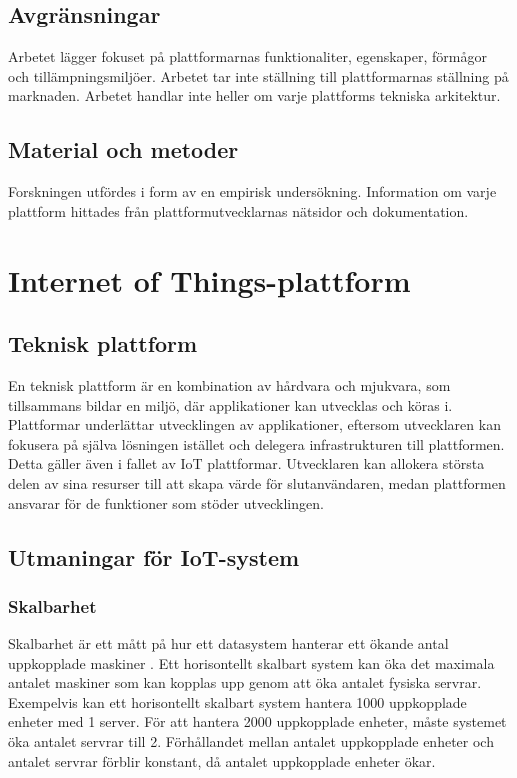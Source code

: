 \subsection{Avgränsningar}
Arbetet lägger fokuset på plattformarnas funktionaliter, egenskaper, förmågor
och tillämpningsmiljöer.
Arbetet tar inte ställning till plattformarnas ställning på marknaden.
Arbetet handlar inte heller om varje plattforms tekniska arkitektur.

\subsection{Material och metoder}
Forskningen utfördes i form av en empirisk undersökning. Information om varje
plattform hittades från plattformutvecklarnas nätsidor och dokumentation.

\pagebreak




\section{Internet of Things-plattform}
\label{sec:esimluku}


\subsection{Teknisk plattform}

En teknisk plattform är en kombination av hårdvara och mjukvara, som
tillsammans bildar en miljö, där applikationer kan utvecklas och köras i.
Plattformar underlättar utvecklingen av applikationer, eftersom utvecklaren
kan fokusera på själva lösningen istället och delegera infrastrukturen
till plattformen.
Detta gäller även i fallet av IoT plattformar. Utvecklaren kan allokera
största delen av sina resurser till att skapa värde för slutanvändaren,
medan plattformen ansvarar för de funktioner som stöder utvecklingen.

\subsection{Utmaningar för IoT-system}

\subsubsection{Skalbarhet}
Skalbarhet är ett mått på hur ett datasystem hanterar ett ökande antal 
uppkopplade maskiner \cite{scalability_def}. Ett horisontellt skalbart system
kan öka det maximala antalet maskiner som kan kopplas upp genom att öka
antalet fysiska servrar.
Exempelvis kan ett horisontellt skalbart system hantera 1000 uppkopplade
enheter med 1 server. För att hantera 2000 uppkopplade enheter, måste systemet
öka antalet servrar till 2. Förhållandet mellan antalet uppkopplade enheter
och antalet servrar förblir konstant, då antalet uppkopplade enheter ökar.

